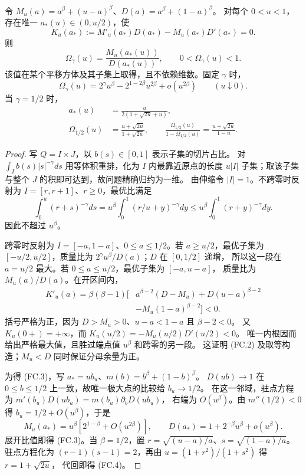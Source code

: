\begin{theorem}[全阈值精确集中函数]\label{thm:flat-concentration}
令 $M_u(a)=a^\beta+(u-a)^\beta$、$D(a)=a^\beta+(1-a)^\beta$。
对每个 $0<u<1$，存在唯一 $a_*(u)\in(0,u/2)$，使
\[
 K_u(a_*):=M'_u(a_*)D(a_*)-M_u(a_*)D'(a_*)=0.
\]
则
\[
 \Omega_\gamma(u)=\frac{M_u(a_*(u))}{D(a_*(u))},\qquad
 0<\Omega_\gamma(u)<1.\tag{FC.2}
\]
该值在某个平移方体及其子集上取得，且不依赖维数。固定 $\gamma$ 时，
\[
 \Omega_\gamma(u)=2^\gamma u^\beta-2^{1-2\beta}u^{2\beta}+o(u^{2\beta})
 \qquad(u\downarrow0).\tag{FC.3}
\]
当 $\gamma=1/2$ 时，
\[
 \begin{aligned}
 a_*(u)&=\frac{u}{2(1+\sqrt{2u}+u)},\\
 \Omega_{1/2}(u)&=\frac{u+\sqrt{2u}}{1+\sqrt{2u}},\qquad
 \frac{\Omega_{1/2}(u)}{1-\Omega_{1/2}(u)}=\frac{u+\sqrt{2u}}{1-u}.
 \end{aligned}\tag{FC.4}
\]
\end{theorem}
\begin{proof}
写 $Q=I\times J$，以 $b(s)\in[0,1]$ 表示子集的切片占比。
对 $\int_Ib(s)|s|^{-\gamma}ds$ 用等体积重排，化为 $I$ 内最靠近原点的长度
$u|I|$ 子集；取该子集与整个 $J$ 的积即可达到，故问题精确归约为一维。
由伸缩令 $|I|=1$。不跨零时反射为 $I=[r,r+1]$、$r\ge0$，最优比满足
\[
 \int_0^u(r+s)^{-\gamma}ds
 =u^\beta\int_0^1(r/u+y)^{-\gamma}dy
 \le u^\beta\int_0^1(r+y)^{-\gamma}dy.
\]
因此不超过 $u^\beta$。

跨零时反射为 $I=[-a,1-a]$、$0\le a\le1/2$。若 $a\ge u/2$，最优子集为
$[-u/2,u/2]$，质量比为 $2^\gamma u^\beta/D(a)$；$D$ 在 $[0,1/2]$ 递增，
所以这一段在 $a=u/2$ 最大。若 $0\le a\le u/2$，最优子集为 $[-a,u-a]$，
质量比为 $M_u(a)/D(a)$。在开区间内，
\[
 \begin{aligned}
 K'_u(a)=\beta(\beta-1)\bigl[&a^{\beta-2}(D-M_u)
       +D(u-a)^{\beta-2}\\
       &-M_u(1-a)^{\beta-2}\bigr]<0.
 \end{aligned}
\]
括号严格为正，因为 $D>M_u>0$、$u-a<1-a$ 且 $\beta-2<0$。
又 $K_u(0+)=+\infty$，而 $K_u(u/2)=-M_u(u/2)D'(u/2)<0$。
唯一内根因而给出严格最大值，且胜过端点值 $u^\beta$ 和跨零的另一段。
这证明 (FC.2) 及取等构造；$M_u<D$ 同时保证分母余量为正。

为得 (FC.3)，写 $a_*=ub_u$、$m(b)=b^\beta+(1-b)^\beta$。
$D(ub)\to1$ 在 $0\le b\le1/2$ 上一致，故唯一极大点的比较给 $b_u\to1/2$。
在这一邻域，驻点方程为 $m'(b_u)D(ub_u)=m(b_u)\partial_bD(ub_u)$，
右端为 $O(u^\beta)$。由 $m''(1/2)<0$ 得 $b_u=1/2+O(u^\beta)$，于是
\[
 M_u(a_*)=u^\beta[2^{1-\beta}+O(u^{2\beta})],\qquad
 D(a_*)=1+2^{-\beta}u^\beta+o(u^\beta).
\]
展开比值即得 (FC.3)。当 $\beta=1/2$，置
$r=\sqrt{(u-a)/a}$、$s=\sqrt{(1-a)/a}$。驻点方程化为
$(r-1)(s-1)=2$，再由 $u=(1+r^2)/(1+s^2)$ 得 $r=1+\sqrt{2u}$，
代回即得 (FC.4)。
\end{proof}

